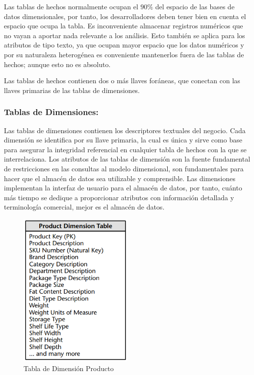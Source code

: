 Las tablas de hechos normalmente ocupan el $90\%$\cite{kimball2011data} del espacio de las bases de datos dimensionales, por tanto, 
los desarrolladores deben tener bien en cuenta el espacio que ocupa la tabla. Es inconveniente almacenar 
registros num\'ericos que no vayan a aportar nada relevante a los an\'alisis. Esto tambi\'en se aplica para los atributos 
de tipo texto, ya que ocupan mayor espacio que los datos num\'ericos y por su naturaleza heterog\'enea es conveniente 
mantenerlos fuera de las tablas de hechos; aunque esto no es absoluto\cite{kimball2011data}.

Las tablas de hechos contienen dos o m\'as llaves for\'aneas, que conectan con las llaves primarias de las tablas de 
dimensiones.
%
\subsubsection{Tablas de Dimensiones: }
%
Las tablas de dimensiones contienen los descriptores textuales del negocio. Cada dimensión se identifica por su llave 
primaria, la cual es \'unica y sirve como base para asegurar la integridad referencial en cualquier tabla de hechos con 
la que se interrelaciona. Los atributos de las tablas de dimensi\'on son la fuente fundamental de restricciones en las 
consultas al modelo dimensional, son fundamentales para hacer que el almacén de datos sea utilizable y comprensible. Las 
dimensiones implementan la interfaz de usuario para el almacén de datos, por tanto, cuánto más tiempo se dedique a 
proporcionar atributos con información detallada y terminología comercial, mejor es el almacén de datos.

\begin{figure}[ht]
    \centering
    \includegraphics[width=0.5\textwidth]{../document/Graphics/dimension.png}
    \caption{Tabla de Dimensi\'on Producto \cite{kimball2011data}}
    \label{fig:dimension}
  \end{figure}

